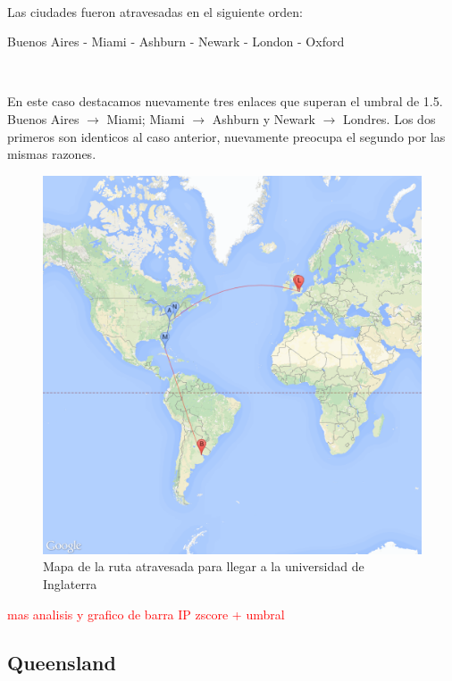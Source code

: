 ~

Las ciudades fueron atravesadas en el siguiente orden:

Buenos Aires - Miami - Ashburn - Newark - London - Oxford

~

En este caso destacamos nuevamente tres enlaces que superan el umbral de 1.5. Buenos Aires $\rightarrow$ Miami; Miami $\rightarrow$ Ashburn y Newark $\rightarrow$ Londres.
Los dos primeros son identicos al caso anterior, nuevamente preocupa el segundo por las mismas razones.

\begin{figure}[H]
	\begin{center}
		  \includegraphics[scale=0.25]{../results/maps/Oxford.png}
		  \caption{Mapa de la ruta atravesada para llegar a la universidad de Inglaterra}
	\end{center}
\end{figure}

\textcolor{red}{mas analisis y grafico de barra IP zscore + umbral}

\subsection{Queensland}

~

